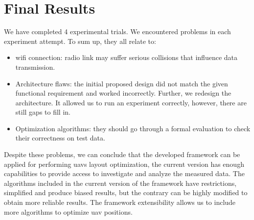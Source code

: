 \clearpage
\section{Final Results}\label{final-results}

We have completed 4 experimental trials. We encountered problems in each experiment attempt. To sum up, they all relate to:

\begin{itemize}
	\tightlist
	\item
	\gls{wifi} connection: radio link may suffer serious collisions that influence data transmission.
	\item
	Architecture flaws: the initial proposed design did not match the given functional requirement and worked incorrectly. Further, we redesign the architecture. It allowed us to run an experiment correctly, however, there are still gaps to fill in.
	\item
	Optimization algorithms: they should go through a formal evaluation to check their correctness on test data.
\end{itemize}

Despite these problems, we can conclude that the developed framework can be applied for performing \glspl{uav} layout optimization, the current version has enough capabilities to provide access to investigate and analyze the measured data. The algorithms included in the current version of the framework have restrictions, simplified and produce biased results, but the contrary can be highly modified to obtain more reliable results. The framework extensibility allows us to include more algorithms to optimize \gls{uav} positions.
